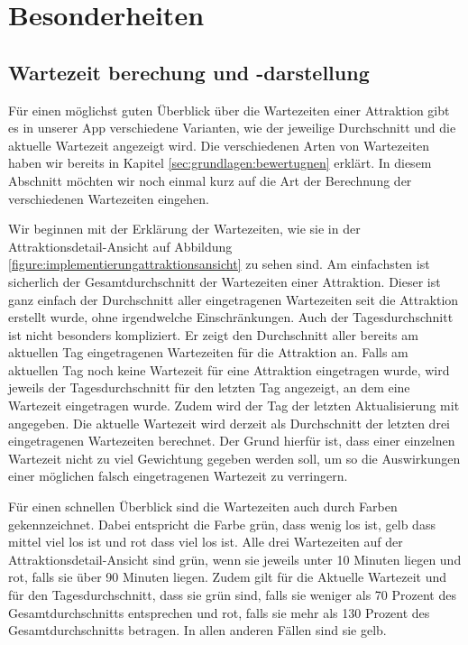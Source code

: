 \section{Besonderheiten}
\label{sec:implementierung:besonderheiten}

\subsection{Wartezeit berechung und -darstellung}
\label{sec:implementierung:besonderheiten:wartezeit}

Für einen möglichst guten Überblick über die Wartezeiten einer Attraktion gibt es in unserer App verschiedene Varianten, wie der jeweilige Durchschnitt und die aktuelle Wartezeit angezeigt wird. Die verschiedenen Arten von Wartezeiten haben wir bereits in Kapitel \ref{sec:grundlagen:bewertugnen} erklärt. In diesem Abschnitt möchten wir noch einmal kurz auf die Art der Berechnung der verschiedenen Wartezeiten eingehen. 

Wir beginnen mit der Erklärung der Wartezeiten, wie sie in der Attraktionsdetail-Ansicht auf Abbildung \ref{figure:implementierungattraktionsansicht} zu sehen sind. Am einfachsten ist sicherlich der Gesamtdurchschnitt der Wartezeiten einer Attraktion. Dieser ist ganz einfach der Durchschnitt aller eingetragenen Wartezeiten seit die Attraktion erstellt wurde, ohne irgendwelche Einschränkungen. Auch der Tagesdurchschnitt ist nicht besonders kompliziert. Er zeigt den Durchschnitt aller bereits am aktuellen Tag eingetragenen Wartezeiten für die Attraktion an. Falls am aktuellen Tag noch keine Wartezeit für eine Attraktion eingetragen wurde, wird jeweils der Tagesdurchschnitt für den letzten Tag angezeigt, an dem eine Wartezeit eingetragen wurde. Zudem wird der Tag der letzten Aktualisierung mit angegeben. Die aktuelle Wartezeit wird derzeit als Durchschnitt der letzten drei eingetragenen Wartezeiten berechnet. Der Grund hierfür ist, dass einer einzelnen Wartezeit nicht zu viel Gewichtung gegeben werden soll, um so die Auswirkungen einer möglichen falsch eingetragenen Wartezeit zu verringern.

Für einen schnellen Überblick sind die Wartezeiten auch durch Farben gekennzeichnet. Dabei entspricht die Farbe grün, dass wenig los ist, gelb dass mittel viel los ist und rot dass viel los ist. Alle drei Wartezeiten auf der Attraktionsdetail-Ansicht sind grün, wenn sie jeweils unter 10 Minuten liegen und rot, falls sie über 90 Minuten liegen. Zudem gilt für die Aktuelle Wartezeit und für den Tagesdurchschnitt, dass sie grün sind, falls sie weniger als 70 Prozent des Gesamtdurchschnitts entsprechen und rot, falls sie mehr als 130 Prozent des Gesamtdurchschnitts betragen. In allen anderen Fällen sind sie gelb. 

